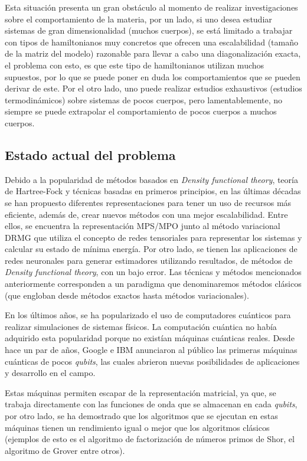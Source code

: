 Esta situación presenta un gran obstáculo al momento de realizar investigaciones sobre el comportamiento de la materia, por un lado, si uno desea estudiar sistemas de gran dimensionalidad (muchos cuerpos), se está limitado a trabajar con tipos de hamiltonianos muy concretos que ofrecen una escalabilidad (tamaño de la matriz del modelo) razonable para llevar a cabo una diagonalización exacta, el problema con esto, es que este tipo de hamiltonianos utilizan muchos supuestos, por lo que se puede poner en duda los comportamientos que se pueden derivar de este. Por el otro lado, uno puede realizar estudios exhaustivos (estudios termodinámicos) sobre sistemas de pocos cuerpos, pero lamentablemente, no siempre se puede extrapolar el comportamiento de pocos cuerpos a muchos cuerpos.


\subsection{Estado actual del problema}
Debido a la popularidad de métodos basados en \textit{Density functional theory}, teoría de Hartree-Fock y técnicas basadas en primeros principios, en las últimas décadas se han propuesto diferentes representaciones para tener un uso de recursos más eficiente, además de, crear nuevos métodos con una mejor escalabilidad. Entre ellos, se encuentra la representación MPS/MPO junto al método variacional DRMG que utiliza el concepto de redes tensoriales para representar los sistemas y calcular su estado de mínima energía. Por otro lado, se tienen las aplicaciones de redes neuronales para generar estimadores utilizando resultados, de métodos de \textit{Density functional theory}\cite{Yin2021}, con un bajo error. Las técnicas y métodos mencionados anteriormente corresponden a un paradigma que denominaremos métodos clásicos (que engloban desde métodos exactos hasta métodos variacionales).

En los últimos años, se ha popularizado el uso de computadores cuánticos para realizar simulaciones de sistemas físicos. La computación cuántica no había adquirido esta popularidad porque no existían máquinas cuánticas reales. Desde hace un par de años, Google e IBM anunciaron al público las primeras máquinas cuánticas de pocos \textit{qubits}, las cuales abrieron nuevas posibilidades de aplicaciones y desarrollo en el campo. 

Estas máquinas permiten escapar de la representación matricial, ya que, se trabaja directamente con las funciones de onda que se almacenan en cada \textit{qubits}, por otro lado, se ha demostrado que los algoritmos que se ejecutan en estas máquinas tienen un rendimiento igual o mejor que los algoritmos clásicos (ejemplos de esto es el algoritmo de factorización de números primos de Shor, el algoritmo de Grover entre otros).

